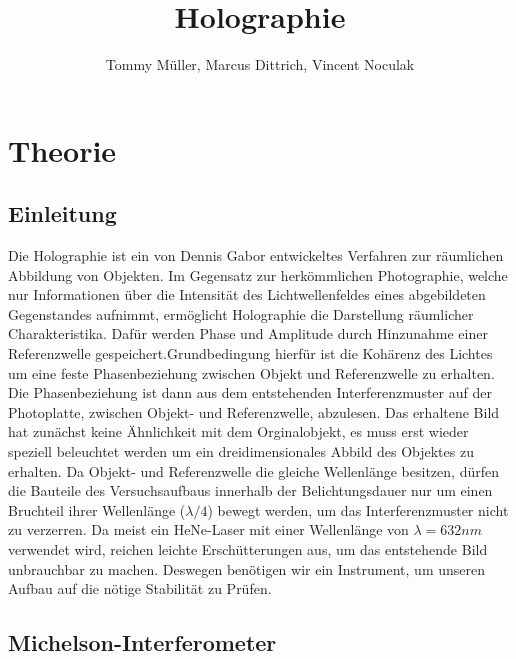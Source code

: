 \documentclass[12pt,a4paper]{article}
\author{Tommy Müller, Marcus Dittrich, Vincent Noculak}
\title{Holographie}
\begin{document}
\maketitle
\newpage
\tableofcontents
\newpage
	
\section{Theorie}

\subsection{Einleitung}

Die Holographie ist ein von Dennis Gabor entwickeltes Verfahren zur räumlichen Abbildung von Objekten. Im Gegensatz zur herkömmlichen Photographie, welche nur Informationen über die Intensität des Lichtwellenfeldes eines abgebildeten Gegenstandes aufnimmt, ermöglicht Holographie die Darstellung räumlicher Charakteristika. Dafür werden Phase und Amplitude durch Hinzunahme einer Referenzwelle gespeichert.Grundbedingung hierfür ist die Kohärenz des Lichtes um eine feste Phasenbeziehung zwischen Objekt und Referenzwelle zu erhalten. Die Phasenbeziehung ist dann aus dem entstehenden Interferenzmuster auf der Photoplatte, zwischen Objekt- und Referenzwelle, abzulesen. Das erhaltene Bild hat zunächst keine Ähnlichkeit mit dem Orginalobjekt, es muss erst wieder speziell beleuchtet werden um ein dreidimensionales Abbild des Objektes zu erhalten. Da Objekt- und Referenzwelle die gleiche Wellenlänge besitzen, dürfen die Bauteile des Versuchsaufbaus innerhalb der Belichtungsdauer nur um einen Bruchteil ihrer Wellenlänge ($\lambda/4$) bewegt werden, um das Interferenzmuster nicht zu verzerren. Da meist ein HeNe-Laser mit einer Wellenlänge von $\lambda = 632nm$ verwendet wird, reichen leichte Erschütterungen aus, um das entstehende Bild unbrauchbar zu machen. Deswegen benötigen wir ein Instrument, um unseren Aufbau auf die nötige Stabilität zu Prüfen. 

\subsection{Michelson-Interferometer}
\end{document}
